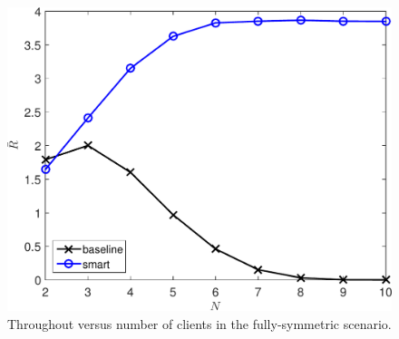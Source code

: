 \documentclass{article}
\begin{document}
\begin{figure}[htbp]
\centering
\includegraphics[scale=0.5]{R_N_sym.pdf}
\caption{Throughout versus number of clients in the fully-symmetric scenario.}
\label{sim: sym: different N}
\end{figure}


\end{document}
